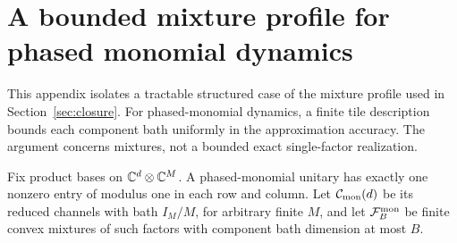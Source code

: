 \section{A bounded mixture profile for phased monomial dynamics}\label{sec:monomial}

This appendix isolates a tractable structured case of the mixture
profile used in Section~\ref{sec:closure}. For phased-monomial
dynamics, a finite tile description bounds each component bath
uniformly in the approximation accuracy. The argument concerns
mixtures, not a bounded exact single-factor realization.

Fix product bases on $\mathbb C^d\otimes\mathbb C^M$. A phased-monomial unitary has exactly one nonzero entry of modulus one in each row and column.
Let $\mathcal C_{\rm mon}(d)$ be its reduced channels with bath $I_M/M$, for arbitrary finite $M$, and let
$\mathcal F_B^{\rm mon}$ be finite convex mixtures of such factors with component bath dimension at most $B$.

